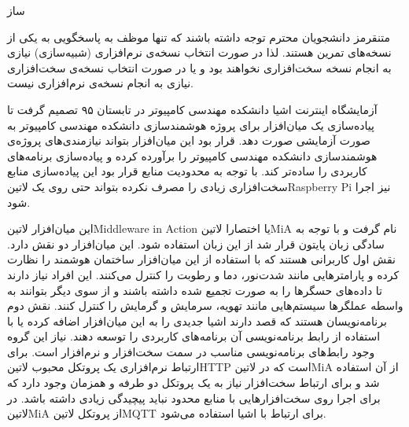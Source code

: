 \documentclass[]{assignment}
\begin{document}
‌ساز

‌متن{قرمز}
{
دانشجویان محترم توجه داشته باشند که تنها موظف به پاسخگویی به یکی از نسخه‌های تمرین هستند. لذا در صورت انتخاب نسخه‌ی نرم‌افزاری (شبیه‌سازی) نیازی به انجام نسخه سخت‌افزاری نخواهند بود و یا در صورت انتخاب نسخه‌ی سخت‌افزاری نیازی به انجام نسخه‌ی نرم‌افزاری نیست.
}


آزمایشگاه اینترنت اشیا دانشکده مهندسی کامپیوتر در تابستان ۹۵ تصمیم گرفت تا پیاده‌سازی یک میان‌افزار برای پروژه هوشمند‌سازی دانشکده مهندسی کامپیوتر به صورت آزمایشی صورت دهد.
قرار بود این میان‌افزار بتواند نیازمندی‌های پروژه‌ی هوشمندسازی دانشکده مهندسی کامپیوتر را برآورده کرده و پیاده‌سازی برنامه‌های کاربردی را ساده‌تر کند.
با توجه به محدودیت منابع قرار بود این پیاده‌سازی منابع سخت‌افزاری
زیادی را مصرف نکرده بتواند حتی روی یک ‌لاتین{Raspberry Pi} نیز اجرا شود.

این میان‌افزار ‌لاتین{Middleware in Action} یا اختصارا ‌لاتین{MiA} نام گرفت و
با توجه به سادگی زبان پایتون قرار شد از این زبان استفاده شود.
این میان‌افزار دو نقش دارد. نقش اول کاربرانی هستند که با استفاده از این میان‌افزار ساختمان هوشمند را نظارت کرده و پارامترهایی مانند شدت‌نور،
دما و رطوبت را کنترل می‌کنند. این افراد نیاز دارند تا داده‌های حسگرها را به صورت تجمیع شده داشته باشند و از سوی دیگر بتوانند به واسطه عملگرها سیستم‌هایی مانند
تهویه، سرمایش و گرمایش را کنترل کنند.
نقش دوم برنامه‌نویسان هستند که قصد دارند اشیا جدیدی را به این میان‌افزار اضافه کرده یا با استفاده از رابط برنامه‌نویسی آن برنامه‌های کاربردی را توسعه دهند.
نیاز این گروه وجود رابط‌های برنامه‌نویسی مناسب در سمت سخت‌افزار و نرم‌افزار است. برای ارتباط نرم‌افزاری یک پروتکل محبوب ‌لاتین{HTTP} است که در
‌لاتین{MiA} از آن استفاده شد و برای ارتباط سخت‌افزار نیاز به یک پروتکل دو طرفه و همزمان وجود دارد که برای اجرا روی سخت‌افزارهایی با
منابع محدود نباید پیچیدگی زیادی داشته باشد. در ‌لاتین{MiA} از پروتکل ‌لاتین{MQTT} برای ارتباط با اشیا استفاده می‌شود.
\end{document}
